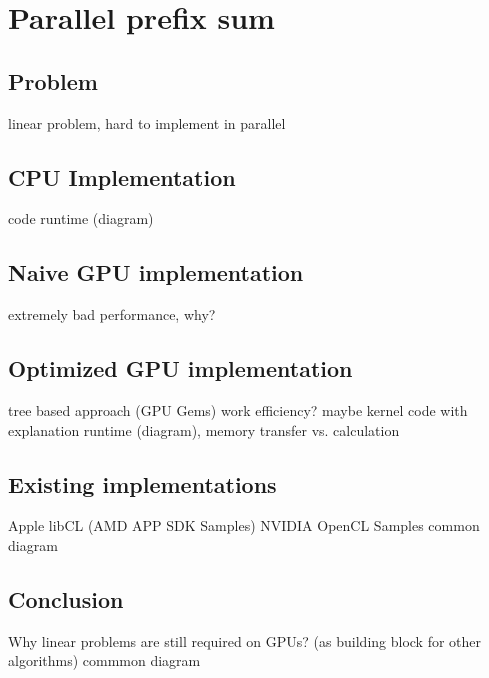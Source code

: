 \section{Parallel prefix sum}

\subsection{Problem}
linear problem, hard to implement in parallel

\subsection{CPU Implementation}
code
runtime (diagram)

\subsection{Naive GPU implementation}
extremely bad performance, why?

\subsection{Optimized GPU implementation}
tree based approach (GPU Gems) work efficiency?
maybe kernel code with explanation
runtime (diagram), memory transfer vs. calculation

\subsection{Existing implementations}
Apple
libCL
(AMD APP SDK Samples)
NVIDIA OpenCL Samples
common diagram

\subsection{Conclusion}
Why linear problems are still required on GPUs? (as building block for other algorithms)
commmon diagram
